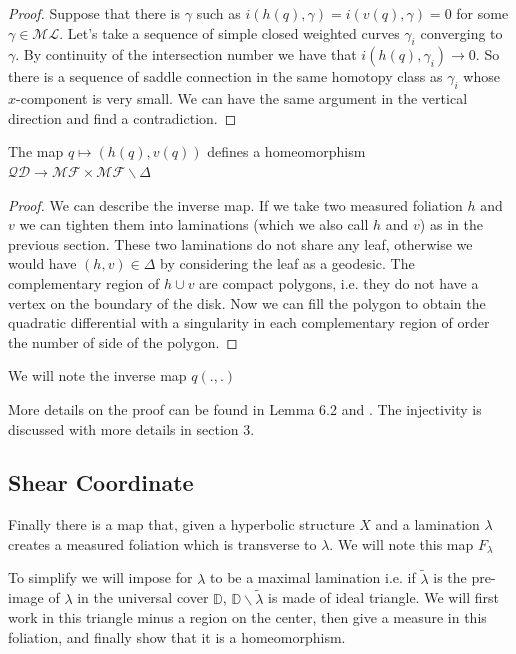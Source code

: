 \begin{proof}
Suppose that there is $\gamma$ such as $i(h(q),\gamma)=i(v(q),\gamma)=0$ for some $\gamma \in \mathcal{ML}$. Let's take a sequence of simple closed weighted curves $\gamma_i$ converging to $\gamma$. By continuity of the intersection number we have that $i(h(q),\gamma_i) \to 0$. So there is a sequence of saddle connection in the same homotopy class as $\gamma_i$ whose $x$-component is very small. We can have the same argument in the vertical direction and find a contradiction.
\end{proof}

\begin{thm}
The map $q \mapsto (h(q),v(q))$ defines a homeomorphism $\mathcal{QD} \to \mathcal{MF} \times \mathcal{MF} \backslash \Delta$
\end{thm}

\begin{proof}
We can describe the inverse map. If we take two measured foliation $h$ and $v$ we can tighten them into laminations (which we also call $h$ and $v$) as in the previous section. These two laminations do not share any leaf, otherwise we would have $(h,v) \in \Delta$ by considering the leaf as a geodesic.
The complementary region of $h \cup v$ are compact polygons, i.e. they do not have a vertex on the boundary of the disk.
Now we can fill the polygon to obtain the quadratic differential with a singularity in each complementary region of order the number of side of the polygon.
\end{proof}

We will note the inverse map $q(.,.)$


More details on the proof can be found in \cite{casson_bleiler_1988} Lemma 6.2 and \cite{QuadHub}. The injectivity is discussed with more details in \cite{Gardiner-1991} section 3.

\subsection{Shear Coordinate}

Finally there is a map that, given a hyperbolic structure $X$ and a lamination $\lambda$ creates a measured foliation which is transverse to $\lambda$. We will note this map $F_\lambda$

To simplify we will impose for $\lambda$ to be a maximal lamination i.e. if $\tilde{\lambda}$ is the pre-image of $\lambda$ in the universal cover $\mathbb{D}$, $\mathbb{D}\backslash \tilde{\lambda}$ is made of ideal triangle. We will first work in this triangle minus a region on the center, then give a measure in this foliation, and finally show that it is a homeomorphism.

